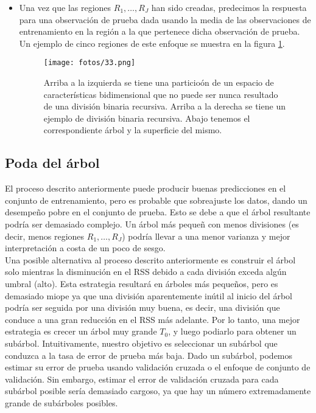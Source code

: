 \begin{itemize}
\item Una vez que las regiones $R_1, \ldots, R_J$ han sido creadas, predecimos la respuesta para una observación de prueba dada usando la media de las observaciones de entrenamiento en la región a la que pertenece dicha observación de prueba. Un ejemplo de cinco regiones de este enfoque se muestra en la figura \ref{fig:6.3}.
\begin{figure}[H]
\centering
\texttt{[image: fotos/33.png]}
\caption{Arriba a la izquierda se tiene una particioón de un espacio de características bidimensional que no puede ser nunca resultado de una división binaria recursiva. Arriba a la derecha se tiene un ejemplo de división binaria recursiva. Abajo tenemos el correspondiente árbol y la superficie del mismo.}
\label{fig:6.3}
\end{figure}
\end{itemize}

\subsection{Poda del árbol}

El proceso descrito anteriormente puede producir buenas predicciones en el conjunto
de entrenamiento, pero es probable que sobreajuste los datos, dando un desempeño pobre en el conjunto de prueba. Esto se debe a que el árbol resultante podría ser demasiado complejo. Un árbol más pequeñ con menos divisiones (es decir, menos regiones $R_1, \ldots, R_J$) podría llevar a una menor varianza y mejor interpretación a costa de un poco de sesgo. \\

Una posible alternativa al proceso descrito anteriormente es construir el árbol solo mientras la disminución en el RSS debido a cada división exceda algún umbral (alto). Esta estrategia resultará en árboles más pequeños, pero es demasiado miope ya que una división aparentemente inútil al inicio del árbol podría ser seguida por una división muy buena, es decir, una división que conduce a una gran reducción en el RSS más adelante. Por lo tanto, una mejor estrategia es crecer un árbol muy grande $T_0$, y luego podiarlo para obtener un subárbol. Intuitivamente, nuestro objetivo es seleccionar un subárbol que conduzca a la tasa de error de prueba más baja. Dado un subárbol, podemos estimar su error de prueba usando validación cruzada o el enfoque de conjunto de validación. Sin embargo, estimar el error de validación cruzada para cada subárbol posible sería demasiado cargoso, ya que hay un número extremadamente grande de subárboles posibles. \\

